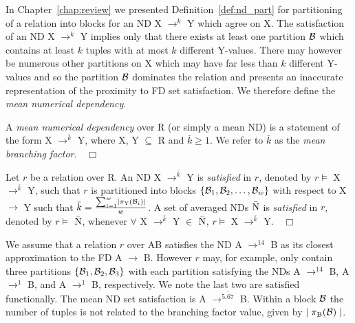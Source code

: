 \smallskip

In Chapter~\ref{chap:review} we presented Definition~\ref{def:nd_part}
for partitioning of a relation into blocks for an ND X $\to^k$ Y which
agree on X.
The satisfaction of an ND X $\to^k$ Y implies only that there exists
at least one partition ${\cal B}$ which contains at least $k$ tuples
with at most $k$ different Y-values.  There may however be numerous
other partitions on X which may have far less than $k$ different
Y-values and so the partition ${\cal B}$ dominates the relation and
presents an inaccurate representation of the proximity to FD set
satisfaction.  We therefore define the {\em mean numerical dependency}.

\begin{definition}\label{def:mean_nd}
\begin{rm}
A {\em mean numerical dependency} over R (or simply a mean ND)
is a statement of the form X $\to^{\bar{k}}$ Y, where X, Y $\subseteq$ R and
$\bar{k} \ge 1$. We refer to $\bar{k}$ as the {\em mean branching
factor}.$\quad\Box$ 
\end{rm}
\end{definition}
\begin{definition}\label{def:sat-mean_nd}
\begin{rm}
Let $r$ be a relation over R.
An ND X $\to^{\bar{k}}$ Y is {\em satisfied} in $r$,
denoted by $r \models$ X $\to^{\bar{k}}$ Y, such that $r$ is
partitioned into blocks 
$\{{\cal B}_1, {\cal B}_2, \ldots, {\cal B}_w\}$ with respect to X
$\to$ Y such that $\bar{k} = \frac{\sum_{i = 1}^{w} \mid
\pi_{\rm Y}({\cal B}_{i}) \mid }{w}$.
A set of averaged NDs $\bar{\rm N}$ is {\em satisfied} in $r$,
denoted by $r \models$ $\bar{\rm N}$, whenever
$\forall$ X $\to^{\bar{k}}$ Y $\in$ $\bar{\rm N}$, $r \models$ X
$\to^{\bar{k}}$ Y.$\quad\Box$ 
\end{rm}
\end{definition}



\begin{example}\label{ex:mean_nd}
\begin{rm}
We assume that a relation $r$ over AB satisfies the ND A $\to^{14}$ B
as its closest approximation to the FD A $\to$ B. However $r$ may, for
example, only
contain three partitions $\{{\cal B}_1, {\cal B}_2, {\cal B}_3\}$
with each partition satisfying the NDs A $\to^{14}$ B, A $\to^{1}$ B,
and A $\to^{1}$ B, respectively. We note the last two are satisfied
functionally. The mean ND set satisfaction is A $\to^{\bar{5.67}}$ B.
Within a block $\cal B$ the number of tuples is not related to
the branching factor value, given by $\mid \pi_{\rm B}({\cal B}) \mid$.
\end{rm}
\end{example}

